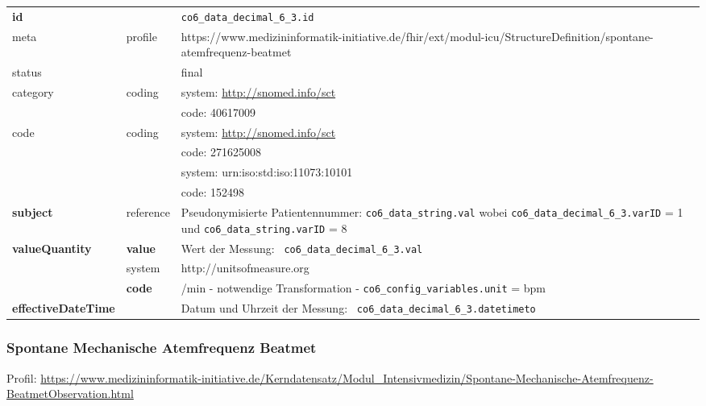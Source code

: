 \begin{longtable}{|l|l|p{7.5cm}|}
        \hline
        \rowcolor{lightgray} \multicolumn{3}{|l|}{Data Mapping (inhaltlich)} \\ \hline
        \textbf{id} &  & \texttt{co6\_data\_decimal\_6\_3.id} \\ \hline
	meta & profile & https://www.medizininformatik-initiative.de/fhir/ext/modul-icu/StructureDefinition/spontane-atemfrequenz-beatmet \\ \hline 
	status &  & final   \\ \hline 
	category & coding & system: \url{http://snomed.info/sct} \\
\cline{3-3}
	& & code: 40617009 \\ \hline
	code & coding & system: \url{http://snomed.info/sct} \\ 
	\cline{3-3} 
	&  & code: 271625008 \\ 
	\cline{3-3} 
	&  & system: urn:iso:std:iso:11073:10101 \\ 
	\cline{3-3}
	&  & code: 152498 \\ \hline
	 \textbf{subject} & reference & Pseudonymisierte Patientennummer: \texttt{co6\_data\_string.val} wobei \texttt{co6\_data\_decimal\_6\_3.varID} = 1 und \texttt{co6\_data\_string.varID} = 8 \\ \hline
	 \textbf{valueQuantity}  & \textbf{value} & Wert der Messung: \texttt{
co6\_data\_decimal\_6\_3.val} \\
        \cline{2-3}
         & system & http://unitsofmeasure.org \\
         \cline{2-3}
         & \textbf{code} & /min - notwendige Transformation - \texttt{co6\_config\_variables.unit} = bpm \\ \hline
     \textbf{effectiveDateTime}  & & Datum und Uhrzeit der Messung: \texttt{
co6\_data\_decimal\_6\_3.datetimeto} \\ \hline
\end{longtable}


\subsubsection{Spontane Mechanische Atemfrequenz Beatmet} 
Profil: \url{https://www.medizininformatik-initiative.de/Kerndatensatz/Modul_Intensivmedizin/Spontane-Mechanische-Atemfrequenz-BeatmetObservation.html}


